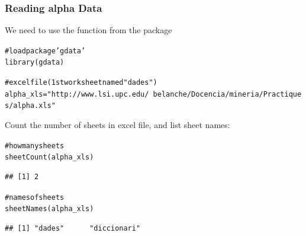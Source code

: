 \documentclass{beamer}\usepackage[]{graphicx}\usepackage[]{color}
\makeatletter
\newcommand{\hlstr}[1]{\textcolor[rgb]{0.063,0.58,0.627}{#1}}%
\newcommand{\hlcom}[1]{\textcolor[rgb]{0.588,0.588,0.588}{#1}}%
\newcommand{\hlstd}[1]{\textcolor[rgb]{0.196,0.196,0.196}{#1}}%
\newcommand{\hlkwb}[1]{\textcolor[rgb]{0.627,0,0.314}{#1}}%
\newcommand{\hlkwd}[1]{\textcolor[rgb]{0.78,0.227,0.412}{#1}}%
\newenvironment{kframe}{%
 \def\at@end@of@kframe{}%
 \ifinner\ifhmode%
  \def\at@end@of@kframe{\end{minipage}}%
  \begin{minipage}{\columnwidth}%
 \fi\fi%
 \def\FrameCommand##1{\hskip\@totalleftmargin \hskip-\fboxsep
 \colorbox{shadecolor}{##1}\hskip-\fboxsep
     \hskip-\linewidth \hskip-\@totalleftmargin \hskip\columnwidth}%
 \MakeFramed {\advance\hsize-\width
   \@totalleftmargin\z@ \linewidth\hsize
   \@setminipage}}%
 {\par\unskip\endMakeFramed%
 \at@end@of@kframe}
\newenvironment{knitrout}{}{} %
\makeatother
\begin{document}
\begin{frame}[fragile]
\frametitle{Reading alpha Data}

We need to use the function  from the package  
\begin{knitrout}\tiny
{}\color{fgcolor}\begin{kframe}
\begin{alltt}
\hlcom{# load package 'gdata'}
\hlkwd{library}\hlstd{(gdata)}

\hlcom{# excel file (1st worksheet named "dades")}
\hlstd{alpha_xls} \hlkwb{=} \hlstr{"http://www.lsi.upc.edu/~belanche/Docencia/mineria/Practiques/alpha.xls"}
\end{alltt}
\end{kframe}
\end{knitrout}

Count the number of sheets in excel file, and list sheet names:
\begin{knitrout}\tiny
{}\color{fgcolor}\begin{kframe}
\begin{alltt}
\hlcom{# how many sheets}
\hlkwd{sheetCount}\hlstd{(alpha_xls)}
\end{alltt}
\begin{verbatim}
## [1] 2
\end{verbatim}
\begin{alltt}
\hlcom{# names of sheets}
\hlkwd{sheetNames}\hlstd{(alpha_xls)}
\end{alltt}
\begin{verbatim}
## [1] "dades"      "diccionari"
\end{verbatim}
\end{kframe}
\end{knitrout}

\end{frame}

\end{document}
